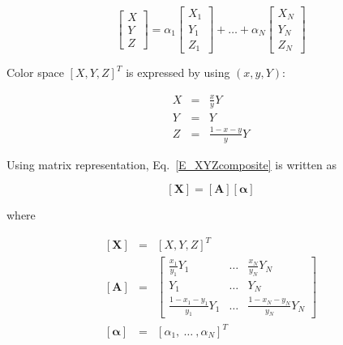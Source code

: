 \documentclass[dvipdfmx,uplatex,a4paper]{article}
\begin{document}
\begin{equation}
  \label{E_XYZcomposite}
  \left[
    \begin{array}{c}
      X \\
      Y \\
      Z
    \end{array}
  \right]
   = \alpha_1
  \left[
    \begin{array}{c}
        X_1 \\
        Y_1 \\
        Z_1
    \end{array}
  \right]
   + \ldots + \alpha_N
  \left[
    \begin{array}{c}
        X_N \\
        Y_N \\
        Z_N
    \end{array}
  \right]
\end{equation}

Color space $[X, Y, Z]^T$ is expressed by using $(x, y, Y)$:

\begin{eqnarray}
  \label{E_xyY2XYZ}
  X & = & \frac{x}{y}  Y \\
  Y & = & Y \\
  Z & = & \frac{1 - x - y}{y} Y
\end{eqnarray}

Using matrix representation, Eq.~\eqref{E_XYZcomposite} is written as

\begin{equation}
  \label{E_X=AY}
  \left[ \boldsymbol{X} \right] =
  \left[ \boldsymbol{A} \right]
  \left[ \boldsymbol{\alpha} \right]
\end{equation}

\noindent
where

\begin{eqnarray}
  \left[ \boldsymbol{X} \right] &=&
  \left[ X, Y, Z \right]^T \label{E_XYZ^T} \\
%
  \left[ \boldsymbol{A} \right] &=&
  \left[
    \begin{array}{ccc}
      \frac{x_1}{y_1} Y_1 & \ldots & \frac{x_N}{y_N} Y_N \\
      Y_1 & \ldots & Y_N \\
      \frac{1 - x_1 - y_1}{y_1}Y_1 & \ldots & \frac{1 - x_N - y_N}{y_N}Y_N
    \end{array}
  \right] \\
%
  \left[ \boldsymbol{\alpha} \right] &=&
  \left[ \alpha_1,\ \ldots\ , \alpha_N \right]^T
\end{eqnarray}
\end{document}
